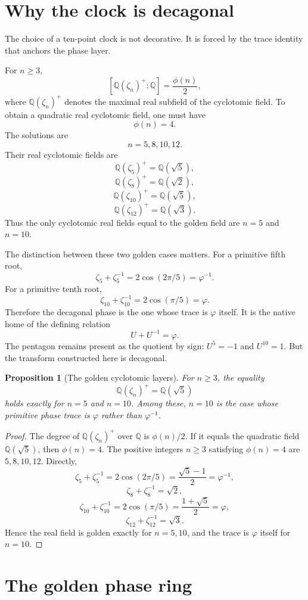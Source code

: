 \documentclass[11pt]{article}
\newtheorem{proposition}[definition]{Proposition}
\newcommand{\ph}{\varphi}
\newcommand{\Q}{\mathbb{Q}}
\newcommand{\zz}{\zeta}
\begin{document}
\section{Why the clock is decagonal}

The choice of a ten-point clock is not decorative.  It is forced by the trace identity that anchors the phase layer.

For $n\ge3$,
\[
    [\Q(\zz_n)^+:\Q]=\frac{\phi(n)}2,
\]
where $\Q(\zz_n)^+$ denotes the maximal real subfield of the cyclotomic field.  To obtain a quadratic real cyclotomic field, one must have
\[
    \phi(n)=4.
\]
The solutions are
\[
    n=5,8,10,12.
\]
Their real cyclotomic fields are
\[
    \Q(\zz_5)^+=\Q(\sqrt5),
\]
\[
    \Q(\zz_8)^+=\Q(\sqrt2),
\]
\[
    \Q(\zz_{10})^+=\Q(\sqrt5),
\]
\[
    \Q(\zz_{12})^+=\Q(\sqrt3).
\]
Thus the only cyclotomic real fields equal to the golden field are $n=5$ and $n=10$.

The distinction between these two golden cases matters.  For a primitive fifth root,
\[
    \zz_5+\zz_5^{-1}=2\cos(2\pi/5)=\ph^{-1}.
\]
For a primitive tenth root,
\[
    \zz_{10}+\zz_{10}^{-1}=2\cos(\pi/5)=\ph.
\]
Therefore the decagonal phase is the one whose trace is $\ph$ itself.  It is the native home of the defining relation
\[
    U+U^{-1}=\ph.
\]
The pentagon remains present as the quotient by sign: $U^5=-1$ and $U^{10}=1$.  But the transform constructed here is decagonal.

\begin{proposition}[The golden cyclotomic layers]
For $n\ge3$, the equality
\[
    \Q(\zz_n)^+=\Q(\sqrt5)
\]
holds exactly for $n=5$ and $n=10$.  Among these, $n=10$ is the case whose primitive phase trace is $\ph$ rather than $\ph^{-1}$.
\end{proposition}

\begin{proof}
The degree of $\Q(\zz_n)^+$ over $\Q$ is $\phi(n)/2$.  If it equals the quadratic field $\Q(\sqrt5)$, then $\phi(n)=4$.  The positive integers $n\ge3$ satisfying $\phi(n)=4$ are $5,8,10,12$.  Directly,
\[
    \zz_5+\zz_5^{-1}=2\cos(2\pi/5)=\frac{\sqrt5-1}{2}=\ph^{-1},
\]
\[
    \zz_8+\zz_8^{-1}=\sqrt2,
\]
\[
    \zz_{10}+\zz_{10}^{-1}=2\cos(\pi/5)=\frac{1+\sqrt5}{2}=\ph,
\]
\[
    \zz_{12}+\zz_{12}^{-1}=\sqrt3.
\]
Hence the real field is golden exactly for $n=5,10$, and the trace is $\ph$ itself for $n=10$.
\end{proof}

\section{The golden phase ring}
\end{document}
